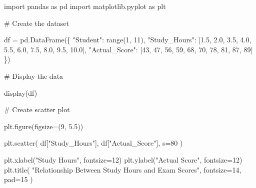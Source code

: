 \documentclass[
  a4paper,
]{article}
\newenvironment{Shaded}{\begin{snugshade}}{\end{snugshade}}
\newcommand{\BuiltInTok}[1]{\textcolor[rgb]{0.00,0.23,0.31}{#1}}
\newcommand{\CommentTok}[1]{\textcolor[rgb]{0.37,0.37,0.37}{#1}}
\newcommand{\DecValTok}[1]{\textcolor[rgb]{0.68,0.00,0.00}{#1}}
\newcommand{\FloatTok}[1]{\textcolor[rgb]{0.68,0.00,0.00}{#1}}
\newcommand{\ImportTok}[1]{\textcolor[rgb]{0.00,0.46,0.62}{#1}}
\newcommand{\NormalTok}[1]{\textcolor[rgb]{0.00,0.23,0.31}{#1}}
\newcommand{\OperatorTok}[1]{\textcolor[rgb]{0.37,0.37,0.37}{#1}}
\newcommand{\StringTok}[1]{\textcolor[rgb]{0.13,0.47,0.30}{#1}}
\begin{document}
\begin{tcolorbox}[enhanced jigsaw, arc=.35mm, bottomrule=.15mm, bottomtitle=1mm, breakable, colback=white, colbacktitle=quarto-callout-tip-color!10!white, colframe=quarto-callout-tip-color-frame, coltitle=black, left=2mm, leftrule=.75mm, opacityback=0, opacitybacktitle=0.6, rightrule=.15mm, title=\textcolor{quarto-callout-tip-color}{\faLightbulb}\hspace{0.5em}{💻 Coding Session}, titlerule=0mm, toprule=.15mm, toptitle=1mm]

\begin{Shaded}
\begin{Highlighting}[]
\ImportTok{import}\NormalTok{ pandas }\ImportTok{as}\NormalTok{ pd}
\ImportTok{import}\NormalTok{ matplotlib.pyplot }\ImportTok{as}\NormalTok{ plt}

\CommentTok{\# Create the dataset}

\NormalTok{df }\OperatorTok{=}\NormalTok{ pd.DataFrame(\{}
    \StringTok{"Student"}\NormalTok{: }\BuiltInTok{range}\NormalTok{(}\DecValTok{1}\NormalTok{, }\DecValTok{11}\NormalTok{),}
    \StringTok{"Study\_Hours"}\NormalTok{: [}\FloatTok{1.5}\NormalTok{, }\FloatTok{2.0}\NormalTok{, }\FloatTok{3.5}\NormalTok{, }\FloatTok{4.0}\NormalTok{, }\FloatTok{5.5}\NormalTok{,}
                    \FloatTok{6.0}\NormalTok{, }\FloatTok{7.5}\NormalTok{, }\FloatTok{8.0}\NormalTok{, }\FloatTok{9.5}\NormalTok{, }\FloatTok{10.0}\NormalTok{],}
    \StringTok{"Actual\_Score"}\NormalTok{: [}\DecValTok{43}\NormalTok{, }\DecValTok{47}\NormalTok{, }\DecValTok{56}\NormalTok{, }\DecValTok{59}\NormalTok{, }\DecValTok{68}\NormalTok{,}
                     \DecValTok{70}\NormalTok{, }\DecValTok{78}\NormalTok{, }\DecValTok{81}\NormalTok{, }\DecValTok{87}\NormalTok{, }\DecValTok{89}\NormalTok{]}
\NormalTok{\})}

\CommentTok{\# Display the data}

\NormalTok{display(df)}

\CommentTok{\# Create scatter plot}

\NormalTok{plt.figure(figsize}\OperatorTok{=}\NormalTok{(}\DecValTok{9}\NormalTok{, }\FloatTok{5.5}\NormalTok{))}

\NormalTok{plt.scatter(}
\NormalTok{    df[}\StringTok{"Study\_Hours"}\NormalTok{],}
\NormalTok{    df[}\StringTok{"Actual\_Score"}\NormalTok{],}
\NormalTok{    s}\OperatorTok{=}\DecValTok{80}
\NormalTok{)}

\NormalTok{plt.xlabel(}\StringTok{"Study Hours"}\NormalTok{, fontsize}\OperatorTok{=}\DecValTok{12}\NormalTok{)}
\NormalTok{plt.ylabel(}\StringTok{"Actual Score"}\NormalTok{, fontsize}\OperatorTok{=}\DecValTok{12}\NormalTok{)}
\NormalTok{plt.title(}
    \StringTok{"Relationship Between Study Hours and Exam Scores"}\NormalTok{,}
\NormalTok{    fontsize}\OperatorTok{=}\DecValTok{14}\NormalTok{,}
\NormalTok{    pad}\OperatorTok{=}\DecValTok{15}
\NormalTok{)}


\end{Highlighting}
\end{Shaded}
\end{tcolorbox}
\end{document}

